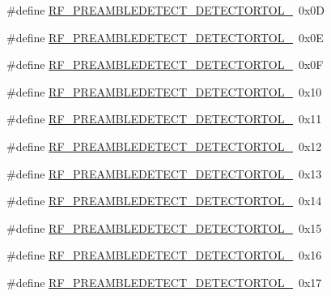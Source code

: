 \begin{DoxyCompactItemize}
\item 
\#define \mbox{\hyperlink{sx1276_regs-_fsk_8h_ab4eac0c4501804c8c5c9a3b7634ea151}{R\+F\+\_\+\+P\+R\+E\+A\+M\+B\+L\+E\+D\+E\+T\+E\+C\+T\+\_\+\+D\+E\+T\+E\+C\+T\+O\+R\+T\+O\+L\+\_}}~0x0D
\item 
\#define \mbox{\hyperlink{sx1276_regs-_fsk_8h_a1699af63f8c2a4aafc0b0b3545de7caf}{R\+F\+\_\+\+P\+R\+E\+A\+M\+B\+L\+E\+D\+E\+T\+E\+C\+T\+\_\+\+D\+E\+T\+E\+C\+T\+O\+R\+T\+O\+L\+\_}}~0x0E
\item 
\#define \mbox{\hyperlink{sx1276_regs-_fsk_8h_ad13b9c3f0b1ba1eea748751f8cff07e0}{R\+F\+\_\+\+P\+R\+E\+A\+M\+B\+L\+E\+D\+E\+T\+E\+C\+T\+\_\+\+D\+E\+T\+E\+C\+T\+O\+R\+T\+O\+L\+\_}}~0x0F
\item 
\#define \mbox{\hyperlink{sx1276_regs-_fsk_8h_aad1ba5659a47a05311fc9165df1df0c7}{R\+F\+\_\+\+P\+R\+E\+A\+M\+B\+L\+E\+D\+E\+T\+E\+C\+T\+\_\+\+D\+E\+T\+E\+C\+T\+O\+R\+T\+O\+L\+\_}}~0x10
\item 
\#define \mbox{\hyperlink{sx1276_regs-_fsk_8h_a79fe78ed30bace2a4a4dc589bb5277fc}{R\+F\+\_\+\+P\+R\+E\+A\+M\+B\+L\+E\+D\+E\+T\+E\+C\+T\+\_\+\+D\+E\+T\+E\+C\+T\+O\+R\+T\+O\+L\+\_}}~0x11
\item 
\#define \mbox{\hyperlink{sx1276_regs-_fsk_8h_ad969caed7162a965ea9c8469d45c42dd}{R\+F\+\_\+\+P\+R\+E\+A\+M\+B\+L\+E\+D\+E\+T\+E\+C\+T\+\_\+\+D\+E\+T\+E\+C\+T\+O\+R\+T\+O\+L\+\_}}~0x12
\item 
\#define \mbox{\hyperlink{sx1276_regs-_fsk_8h_a6295b4fba95341315d256126bdb6506d}{R\+F\+\_\+\+P\+R\+E\+A\+M\+B\+L\+E\+D\+E\+T\+E\+C\+T\+\_\+\+D\+E\+T\+E\+C\+T\+O\+R\+T\+O\+L\+\_}}~0x13
\item 
\#define \mbox{\hyperlink{sx1276_regs-_fsk_8h_a685d199aafb86300e1bbcc48cd2b5646}{R\+F\+\_\+\+P\+R\+E\+A\+M\+B\+L\+E\+D\+E\+T\+E\+C\+T\+\_\+\+D\+E\+T\+E\+C\+T\+O\+R\+T\+O\+L\+\_}}~0x14
\item 
\#define \mbox{\hyperlink{sx1276_regs-_fsk_8h_aeb0a1361059deb9b9d086027dbfc1e9e}{R\+F\+\_\+\+P\+R\+E\+A\+M\+B\+L\+E\+D\+E\+T\+E\+C\+T\+\_\+\+D\+E\+T\+E\+C\+T\+O\+R\+T\+O\+L\+\_}}~0x15
\item 
\#define \mbox{\hyperlink{sx1276_regs-_fsk_8h_a047c2d4c92a0348034cb38f31878a72a}{R\+F\+\_\+\+P\+R\+E\+A\+M\+B\+L\+E\+D\+E\+T\+E\+C\+T\+\_\+\+D\+E\+T\+E\+C\+T\+O\+R\+T\+O\+L\+\_}}~0x16
\item 
\#define \mbox{\hyperlink{sx1276_regs-_fsk_8h_a2e8f5ccecf0338fbb43c7aace746214b}{R\+F\+\_\+\+P\+R\+E\+A\+M\+B\+L\+E\+D\+E\+T\+E\+C\+T\+\_\+\+D\+E\+T\+E\+C\+T\+O\+R\+T\+O\+L\+\_}}~0x17
\item 

\end{DoxyCompactItemize}

